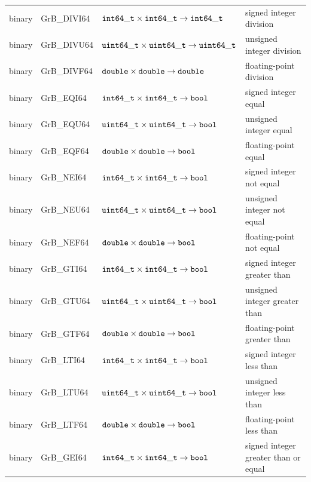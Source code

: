 \documentclass[11pt]{extarticle}
\begin{document}
\begin{table}
\begin{center}
\begin{tabular}{l|l|l|l}
binary		& {\sf GrB\_DIVI64}	& ${\tt int64\_t} \times {\tt int64\_t} \rightarrow {\tt int64\_t}$ 	& signed integer division \\
binary		& {\sf GrB\_DIVU64}	& ${\tt uint64\_t} \times {\tt uint64\_t} \rightarrow {\tt uint64\_t}$ 	& unsigned integer division \\
binary		& {\sf GrB\_DIVF64}	& ${\tt double} \times {\tt double} \rightarrow {\tt double}$ 		& floating-point division \\
binary		& {\sf GrB\_EQI64}	& ${\tt int64\_t} \times {\tt int64\_t} \rightarrow {\tt bool}$		& signed integer  equal \\
binary		& {\sf GrB\_EQU64}	& ${\tt uint64\_t} \times {\tt uint64\_t} \rightarrow {\tt bool}$ 	& unsigned integer  equal \\
binary		& {\sf GrB\_EQF64}	& ${\tt double} \times {\tt double} \rightarrow {\tt bool}$ 		& floating-point  equal \\
binary		& {\sf GrB\_NEI64}	& ${\tt int64\_t} \times {\tt int64\_t} \rightarrow {\tt bool}$		& signed integer not equal \\
binary		& {\sf GrB\_NEU64}	& ${\tt uint64\_t} \times {\tt uint64\_t} \rightarrow {\tt bool}$ 	& unsigned integer not equal \\
binary		& {\sf GrB\_NEF64}	& ${\tt double} \times {\tt double} \rightarrow {\tt bool}$ 		& floating-point not equal \\
binary		& {\sf GrB\_GTI64}	& ${\tt int64\_t} \times {\tt int64\_t} \rightarrow {\tt bool}$		& signed integer greater than  \\
binary		& {\sf GrB\_GTU64}	& ${\tt uint64\_t} \times {\tt uint64\_t} \rightarrow {\tt bool}$ 	& unsigned integer greater than  \\
binary		& {\sf GrB\_GTF64}	& ${\tt double} \times {\tt double} \rightarrow {\tt bool}$ 		& floating-point greater than  \\
binary		& {\sf GrB\_LTI64}	& ${\tt int64\_t} \times {\tt int64\_t} \rightarrow {\tt bool}$		& signed integer less than  \\
binary		& {\sf GrB\_LTU64}	& ${\tt uint64\_t} \times {\tt uint64\_t} \rightarrow {\tt bool}$ 	& unsigned integer less than  \\
binary		& {\sf GrB\_LTF64}	& ${\tt double} \times {\tt double} \rightarrow {\tt bool}$ 		& floating-point less than  \\
binary		& {\sf GrB\_GEI64}	& ${\tt int64\_t} \times {\tt int64\_t} \rightarrow {\tt bool}$		& signed integer greater than or equal \\

\end{tabular}
\end{center}
\end{table}
\end{document}
